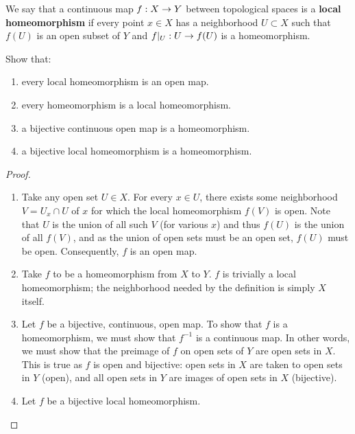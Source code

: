 \documentclass{mathnotes}
\begin{document}
\begin{defn}
    We say that a continuous map $f:X\rightarrow Y$ between topological spaces is a \textbf{local homeomorphism} if every point
    $x\in X$ has a neighborhood $U\subset X$ such that $f(U)$ is an open subset of $Y$ and $f|_U:U\rightarrow f(U)$ is a homeomorphism.
\end{defn}

\begin{exc}
    Show that:
    \begin{enumerate}
        \item every local homeomorphism is an open map.
        \item every homeomorphism is a local homeomorphism.
        \item a bijective continuous open map is a homeomorphism.
        \item a bijective local homeomorphism is a homeomorphism.
    \end{enumerate}
\end{exc}
\begin{proof}
    \hspace{1mm} 
    \begin{enumerate}
        \item Take any open set $U\in X$. For every $x\in U$, there exists some neighborhood $V=U_x\cap U$
            of $x$ for which the local homeomorphism $f(V)$ is open. Note that $U$ is the union of all such $V$ (for various $x$)
            and thus $f(U)$ is the union of all $f(V)$, and as the union of open sets must be an open set, $f(U)$ must be open.
            Consequently, $f$ is an open map.
        \item Take $f$ to be a homeomorphism from $X$ to $Y$. $f$ is trivially a local homeomorphism; the neighborhood needed by
            the definition is simply $X$ itself.
        \item Let $f$ be a bijective, continuous, open map. To show that $f$ is a homeomorphism, we must show that $f^{-1}$
            is a continuous map. In other words, we must show that the preimage of $f$ on open sets of $Y$ are open
            sets in $X$. This is true as $f$ is open and bijective: open sets in $X$ are taken to open sets in $Y$ (open), and
            all open sets in $Y$ are images of open sets in $X$ (bijective).
        \item Let $f$ be a bijective local homeomorphism. 
    \end{enumerate}
\end{proof}
\end{document}
